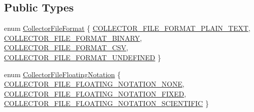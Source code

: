 \subsection*{Public Types}
\begin{DoxyCompactItemize}
\item 
enum \hyperlink{group__cisst_multi_task_gaa228bed8144053d0bfa316f9ac9d0901}{Collector\+File\+Format} \{ \hyperlink{group__cisst_multi_task_ggaa228bed8144053d0bfa316f9ac9d0901abbf072308b212f1331b566519d0c178d}{C\+O\+L\+L\+E\+C\+T\+O\+R\+\_\+\+F\+I\+L\+E\+\_\+\+F\+O\+R\+M\+A\+T\+\_\+\+P\+L\+A\+I\+N\+\_\+\+T\+E\+X\+T}, 
\hyperlink{group__cisst_multi_task_ggaa228bed8144053d0bfa316f9ac9d0901ab8cbb54e933107857df1a7745a95bf05}{C\+O\+L\+L\+E\+C\+T\+O\+R\+\_\+\+F\+I\+L\+E\+\_\+\+F\+O\+R\+M\+A\+T\+\_\+\+B\+I\+N\+A\+R\+Y}, 
\hyperlink{group__cisst_multi_task_ggaa228bed8144053d0bfa316f9ac9d0901a4ee4b02e555603aafc22593f28cc7841}{C\+O\+L\+L\+E\+C\+T\+O\+R\+\_\+\+F\+I\+L\+E\+\_\+\+F\+O\+R\+M\+A\+T\+\_\+\+C\+S\+V}, 
\hyperlink{group__cisst_multi_task_ggaa228bed8144053d0bfa316f9ac9d0901ae29b8a9aa7f007f9b5ef48824c0d34c5}{C\+O\+L\+L\+E\+C\+T\+O\+R\+\_\+\+F\+I\+L\+E\+\_\+\+F\+O\+R\+M\+A\+T\+\_\+\+U\+N\+D\+E\+F\+I\+N\+E\+D}
 \}
\item 
enum \hyperlink{group__cisst_multi_task_gad5d486fde9f8105e4de551d00026ea93}{Collector\+File\+Floating\+Notation} \{ \hyperlink{group__cisst_multi_task_ggad5d486fde9f8105e4de551d00026ea93ad16b37e54a197f2279fa9bbb6671d05a}{C\+O\+L\+L\+E\+C\+T\+O\+R\+\_\+\+F\+I\+L\+E\+\_\+\+F\+L\+O\+A\+T\+I\+N\+G\+\_\+\+N\+O\+T\+A\+T\+I\+O\+N\+\_\+\+N\+O\+N\+E}, 
\hyperlink{group__cisst_multi_task_ggad5d486fde9f8105e4de551d00026ea93a6a7b1140c5dcef2cbd16ba1198df1f6b}{C\+O\+L\+L\+E\+C\+T\+O\+R\+\_\+\+F\+I\+L\+E\+\_\+\+F\+L\+O\+A\+T\+I\+N\+G\+\_\+\+N\+O\+T\+A\+T\+I\+O\+N\+\_\+\+F\+I\+X\+E\+D}, 
\hyperlink{group__cisst_multi_task_ggad5d486fde9f8105e4de551d00026ea93a9aa1dc07dd5f31c35bffc8c03c32e2c8}{C\+O\+L\+L\+E\+C\+T\+O\+R\+\_\+\+F\+I\+L\+E\+\_\+\+F\+L\+O\+A\+T\+I\+N\+G\+\_\+\+N\+O\+T\+A\+T\+I\+O\+N\+\_\+\+S\+C\+I\+E\+N\+T\+I\+F\+I\+C}
 \}
\end{DoxyCompactItemize}
